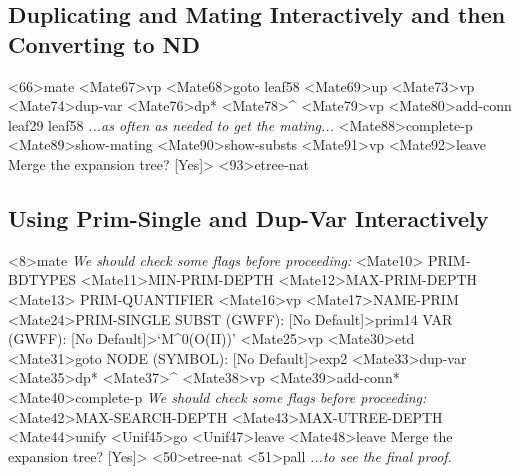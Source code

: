 \subsection{Duplicating and Mating Interactively and then Converting to ND}

\begin{tpsexample}
<66>mate
<Mate67>vp
<Mate68>goto leaf58
<Mate69>up
<Mate73>vp
<Mate74>dup-var
<Mate76>dp*
<Mate78>^
<Mate79>vp
<Mate80>add-conn leaf29 leaf58
{\it ...as often as needed to get the mating...}
<Mate88>complete-p
<Mate89>show-mating
<Mate90>show-substs
<Mate91>vp
<Mate92>leave
Merge the expansion tree? [Yes]>
<93>etree-nat
\end{tpsexample}

\subsection{Using Prim-Single and Dup-Var Interactively}

\begin{tpsexample}
<8>mate
{\it We should check some flags before proceeding:}
<Mate10> PRIM-BDTYPES
<Mate11>MIN-PRIM-DEPTH
<Mate12>MAX-PRIM-DEPTH
<Mate13> PRIM-QUANTIFIER
<Mate16>vp
<Mate17>NAME-PRIM
<Mate24>PRIM-SINGLE
SUBST (GWFF):  [No Default]>prim14
VAR (GWFF):  [No Default]>`M^0(O(II))'
<Mate25>vp
<Mate30>etd
<Mate31>goto
NODE (SYMBOL):  [No Default]>exp2
<Mate33>dup-var
<Mate35>dp*
<Mate37>^
<Mate38>vp
<Mate39>add-conn*
<Mate40>complete-p
{\it We should check some flags before proceeding:}
<Mate42>MAX-SEARCH-DEPTH
<Mate43>MAX-UTREE-DEPTH
<Mate44>unify
<Unif45>go
<Unif47>leave
<Mate48>leave
Merge the expansion tree? [Yes]>
<50>etree-nat
<51>pall
{\it ...to see the final proof.}
\end{tpsexample}

